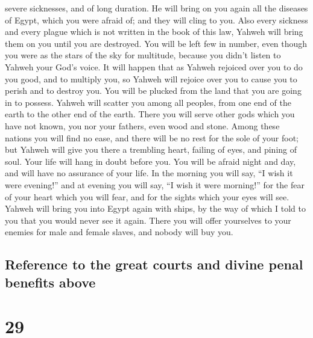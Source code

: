 severe sicknesses, and of long duration.  He will bring
on you again all the diseases of Egypt, which you were afraid of; and
they will cling to you.  Also every sickness and every
plague which is not written in the book of this law, Yahweh will bring
them on you until you are destroyed.  You will be left
few in number, even though you were as the stars of the sky for
multitude, because you didn't listen to Yahweh your God's voice.
 It will happen that as Yahweh rejoiced over you to do
you good, and to multiply you, so Yahweh will rejoice over you to cause
you to perish and to destroy you. You will be plucked from the land that
you are going in to possess.  Yahweh will scatter you
among all peoples, from one end of the earth to the other end of the
earth. There you will serve other gods which you have not known, you nor
your fathers, even wood and stone.  Among these nations
you will find no ease, and there will be no rest for the sole of your
foot; but Yahweh will give you there a trembling heart, failing of eyes,
and pining of soul.  Your life will hang in doubt before
you. You will be afraid night and day, and will have no assurance of
your life.  In the morning you will say, ``I wish it were
evening!'' and at evening you will say, ``I wish it were morning!'' for
the fear of your heart which you will fear, and for the sights which
your eyes will see.  Yahweh will bring you into Egypt
again with ships, by the way of which I told to you that you would never
see it again. There you will offer yourselves to your enemies for male
and female slaves, and nobody will buy you.

\hypertarget{reference-to-the-great-courts-and-divine-penal-benefits-above}{%
\subsection{Reference to the great courts and divine penal benefits
above}\label{reference-to-the-great-courts-and-divine-penal-benefits-above}}

\hypertarget{section-28}{%
\section{29}\label{section-28}}

